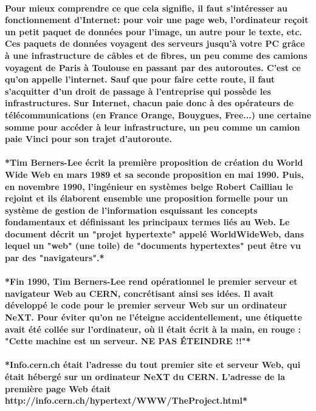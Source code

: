 \paragraph{
  Pour mieux comprendre ce que cela signifie, il faut s'intéresser au fonctionnement d'Internet: pour voir une page web, l'ordinateur reçoit un petit paquet de données pour l'image, un autre pour le texte, etc. Ces paquets de données voyagent des serveurs jusqu'à votre PC grâce à une infrastructure de câbles et de fibres, un peu comme des camions voyagent de Paris à Toulouse en passant par des autoroutes. C'est ce qu'on appelle l'internet. Sauf que pour faire cette route, il faut s'acquitter d'un droit de passage à l'entreprise qui possède les infrastructures. Sur Internet, chacun paie donc à des opérateurs de télécommunications (en France Orange, Bouygues, Free...) une certaine somme pour accéder à leur infrastructure, un peu comme un camion paie Vinci pour son trajet d'autoroute.
}

\paragraph{
  *Tim Berners-Lee écrit la première proposition de création du World Wide Web en mars 1989 et sa seconde proposition en mai 1990. Puis, en novembre 1990, l’ingénieur en systèmes belge Robert Cailliau le rejoint et ils élaborent ensemble une proposition formelle pour un système de gestion de l'information esquissant les concepts fondamentaux et définissant les principaux termes liés au Web. Le document décrit un "projet hypertexte" appelé WorldWideWeb, dans lequel un "web" (une toile) de "documents hypertextes" peut être vu par des "navigateurs".*
}

\paragraph{
  *Fin 1990, Tim Berners-Lee rend opérationnel le premier serveur et navigateur Web au CERN, concrétisant ainsi ses idées. Il avait développé le code pour le premier serveur Web sur un ordinateur NeXT. Pour éviter qu'on ne l'éteigne accidentellement, une étiquette avait été collée sur l'ordinateur, où il était écrit à la main, en rouge : "Cette machine est un serveur. NE PAS ÉTEINDRE !!"*
}

\paragraph{
  *Info.cern.ch était l’adresse du tout premier site et serveur Web, qui était hébergé sur un ordinateur NeXT du CERN. L’adresse de la première page Web était http://info.cern.ch/hypertext/WWW/TheProject.html*
}

